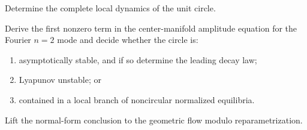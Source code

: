 \documentclass[10pt,a4paper]{article}
\theoremstyle{definition}
\begin{document}
Determine the complete local dynamics of the unit circle.

Derive the first nonzero term in the center-manifold amplitude equation for
the Fourier $n=2$ mode and decide whether the circle is:

\begin{enumerate}
  \item asymptotically stable, and if so determine the leading decay law;
  \item Lyapunov unstable; or
  \item contained in a local branch of noncircular normalized equilibria.
\end{enumerate}

Lift the normal-form conclusion to the geometric flow modulo
reparametrization.
\end{document}
